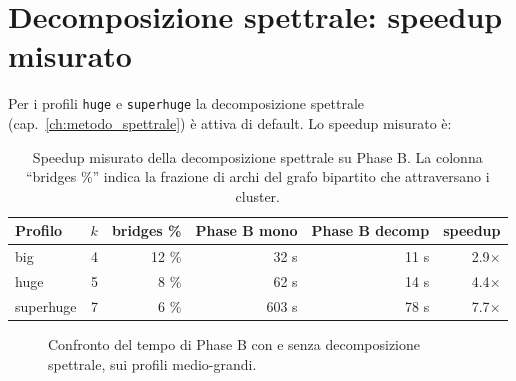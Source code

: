 \section{Decomposizione spettrale: speedup misurato}

Per i profili \texttt{huge} e \texttt{superhuge} la
decomposizione spettrale (cap.~\ref{ch:metodo_spettrale})
\`e attiva di default. Lo speedup misurato \`e:

\begin{table}[h]
\centering
\sffamily\small
\begin{tabular}{lrrrrr}
\toprule
Profilo    & $k$ & bridges \% & Phase B mono & Phase B decomp & speedup \\
\midrule
big        & 4 & 12 \%  & 32 s & 11 s &  2.9$\times$ \\
huge       & 5 &  8 \%  & 62 s & 14 s &  4.4$\times$ \\
superhuge  & 7 &  6 \%  & 603 s & 78 s & 7.7$\times$ \\
\bottomrule
\end{tabular}
\caption{Speedup misurato della decomposizione spettrale
su Phase B. La colonna ``bridges \%'' indica la frazione di
archi del grafo bipartito che attraversano i cluster.}
\label{tab:bench-decomp}
\end{table}

\begin{figure}[h]
\centering
{}
\caption{Confronto del tempo di Phase B con e senza
decomposizione spettrale, sui profili medio-grandi.}
\label{fig:bench-decomp}
\end{figure}

